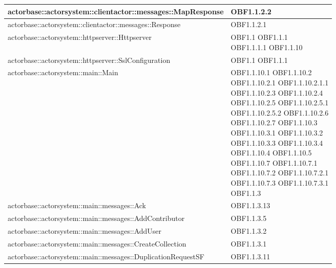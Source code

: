 \documentclass{scalatekids-article}
\begin{document}
\begin{longtable}[H]{|p{12cm}|p{5.5cm}|}
\hline
actorbase::actorsystem::clientactor::messages::MapResponse & \multiLineCell[t]{OBF1.1.2.2\\}\\
\hline
actorbase::actorsystem::clientactor::messages::Response & \multiLineCell[t]{OBF1.1.2.1\\}\\
\hline
actorbase::actorsystem::httpserver::Httpserver & \multiLineCell[t]{OBF1.1 OBF1.1.1\\OBF1.1.1.1 OBF1.1.10\\}\\
\hline
actorbase::actorsystem::httpserver::SslConfiguration & \multiLineCell[t]{OBF1.1 OBF1.1.1\\}\\
\hline
actorbase::actorsystem::main::Main & \multiLineCell[t]{OBF1.1.10.1 OBF1.1.10.2\\OBF1.1.10.2.1 OBF1.1.10.2.1.1\\OBF1.1.10.2.3 OBF1.1.10.2.4\\OBF1.1.10.2.5 OBF1.1.10.2.5.1\\OBF1.1.10.2.5.2 OBF1.1.10.2.6\\OBF1.1.10.2.7 OBF1.1.10.3\\OBF1.1.10.3.1 OBF1.1.10.3.2\\OBF1.1.10.3.3 OBF1.1.10.3.4\\OBF1.1.10.4 OBF1.1.10.5\\OBF1.1.10.7 OBF1.1.10.7.1\\OBF1.1.10.7.2 OBF1.1.10.7.2.1\\OBF1.1.10.7.3 OBF1.1.10.7.3.1\\OBF1.1.3}\\
\hline
actorbase::actorsystem::main::messages::Ack & \multiLineCell[t]{OBF1.1.3.13\\}\\
\hline
actorbase::actorsystem::main::messages::AddContributor & \multiLineCell[t]{OBF1.1.3.5\\}\\
\hline
actorbase::actorsystem::main::messages::AddUser & \multiLineCell[t]{OBF1.1.3.2\\}\\
\hline
actorbase::actorsystem::main::messages::CreateCollection & \multiLineCell[t]{OBF1.1.3.1\\}\\
\hline
actorbase::actorsystem::main::messages::DuplicationRequestSF & \multiLineCell[t]{OBF1.1.3.11\\}\\

\end{longtable}
\end{document}
